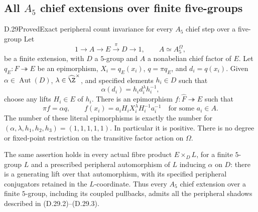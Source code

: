 \subsection{All $A_5$ chief extensions over finite five-groups}

\begin{statement}{D.29}{Proved}{Exact peripheral count invariance for every $A_5$ chief step over a five-group}
Let
\[
 1\longrightarrow A\longrightarrow E\xrightarrow{\pi}D
 \longrightarrow1,
 \qquad A\simeq A_5^{\Omega},
 \tag{D.29.1}
\]
be a finite extension, with $D$ a $5$-group and $A$ a
nonabelian chief factor of $E$.  Let
$q_E:\widehat F\twoheadrightarrow E$ be an epimorphism,
$X_i=q_E(x_i)$, $q=\pi q_E$, and $d_i=q(x_i)$.
Given $\alpha\in\operatorname{Aut}(D)$,
$\lambda\in\widehat\Z^\times$, and specified elements
$h_i\in D$ such that
\[
           \alpha(d_i)=h_i d_i^\lambda h_i^{-1},
 \tag{D.29.2}
\]
choose any lifts $H_i\in E$ of $h_i$.
There is an epimorphism $f:\widehat F\twoheadrightarrow E$
such that
\[
 \pi f=\alpha q,
 \qquad
 f(x_i)=a_iH_iX_i^\lambda H_i^{-1}a_i^{-1}
              \quad\text{for some }a_i\in A.
 \tag{D.29.3}
\]
The number of these literal epimorphisms is exactly the
number for $(\alpha,\lambda,h_1,h_2,h_3)=(1,1,1,1,1)$.
In particular it is positive.  There is no degree or
fixed-point restriction on the transitive factor action
on $\Omega$.

The same assertion holds in every actual fibre product
$E\times_D L$, for a finite $5$-group $L$ and a prescribed
peripheral automorphism of $L$ inducing $\alpha$ on $D$:
there is a generating lift over that automorphism, with
its specified peripheral conjugators retained in the
$L$-coordinate.  Thus every $A_5$ chief extension over a
finite $5$-group, including its coupled pullbacks, admits
all the peripheral shadows described in
\textup{(D.29.2)--(D.29.3)}.
\end{statement}

